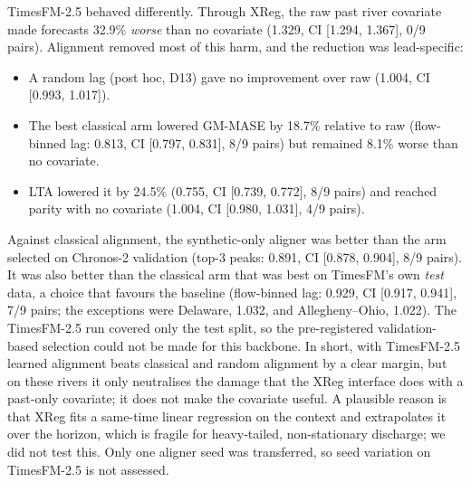 \documentclass[preprint,11pt,authoryear]{elsarticle}
\newcommand{\lta}{\textsc{LTA}}
\begin{document}
TimesFM-2.5 behaved differently. Through XReg, the raw past river covariate made forecasts 32.9\% \emph{worse} than no covariate (1.329, CI [1.294, 1.367], 0/9 pairs). Alignment removed most of this harm, and the reduction was lead-specific:
\begin{itemize}
\item A random lag (post hoc, D13) gave no improvement over raw (1.004, CI [0.993, 1.017]).
\item The best classical arm lowered GM-MASE by 18.7\% relative to raw (flow-binned lag: 0.813, CI [0.797, 0.831], 8/9 pairs) but remained 8.1\% worse than no covariate.
\item \lta{} lowered it by 24.5\% (0.755, CI [0.739, 0.772], 8/9 pairs) and reached parity with no covariate (1.004, CI [0.980, 1.031], 4/9 pairs).
\end{itemize}
Against classical alignment, the synthetic-only aligner was better than the arm selected on Chronos-2 validation (top-3 peaks: 0.891, CI [0.878, 0.904], 8/9 pairs). It was also better than the classical arm that was best on TimesFM's own \emph{test} data, a choice that favours the baseline (flow-binned lag: 0.929, CI [0.917, 0.941], 7/9 pairs; the exceptions were Delaware, 1.032, and Allegheny--Ohio, 1.022). The TimesFM-2.5 run covered only the test split, so the pre-registered validation-based selection could not be made for this backbone. In short, with TimesFM-2.5 learned alignment beats classical and random alignment by a clear margin, but on these rivers it only neutralises the damage that the XReg interface does with a past-only covariate; it does not make the covariate useful. A plausible reason is that XReg fits a same-time linear regression on the context and extrapolates it over the horizon, which is fragile for heavy-tailed, non-stationary discharge; we did not test this. Only one aligner seed was transferred, so seed variation on TimesFM-2.5 is not assessed.


\end{document}
